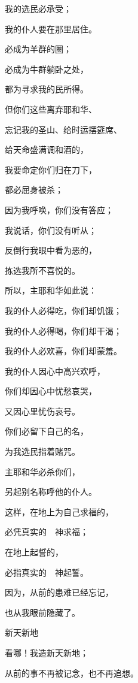 {\par }{\Q 我的选民必承受；
\par }{\Q 我的仆人要在那里居住。
\par }{\Q {}必成为羊群的圈；
\par }{必成为牛群躺卧之处，
\par }{\Q 都为寻求我的民所得。
\par }{\Q {}但你们这些离弃耶和华、
\par }{\Q 忘记我的圣山、给时运摆筵席、
\par }{\Q 给天命盛满调和酒的，
\par }{\Q {}我要命定你们归在刀下，
\par }{\Q 都必屈身被杀；
\par }{\Q 因为我呼唤，你们没有答应；
\par }{\Q 我说话，你们没有听从；
\par }{\Q 反倒行我眼中看为恶的，
\par }{\Q 拣选我所不喜悦的。
\par }{\BB \par }{\Q {}所以，主耶和华如此说：
\par }{\Q 我的仆人必得吃，你们却饥饿；
\par }{\Q 我的仆人必得喝，你们却干渴；
\par }{\Q 我的仆人必欢喜，你们却蒙羞。
\par }{\Q {}我的仆人因心中高兴欢呼，
\par }{\Q 你们却因心中忧愁哀哭，
\par }{\Q 又因心里忧伤哀号。
\par }{\Q {}你们必留下自己的名，
\par }{\Q 为我选民指着赌咒。
\par }{\Q 主耶和华必杀你们，
\par }{\Q 另起别名称呼他的仆人。
\par }{\Q {}这样，在地上为自己求福的，
\par }{\Q 必凭真实的　神求福；
\par }{\Q 在地上起誓的，
\par }{\Q 必指真实的　神起誓。
\par }{\Q 因为，从前的患难已经忘记，
\par }{\Q 也从我眼前隐藏了。
\par }{\SH 新天新地
\par }{\Q {}看哪！我造新天新地；
\par }{\Q 从前的事不再被记念，也不再追想。
}
